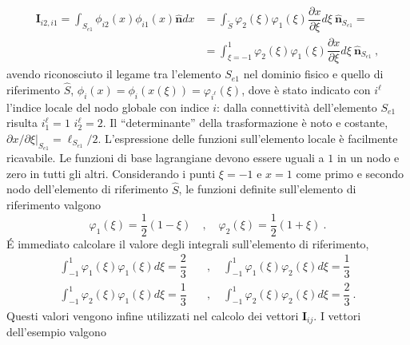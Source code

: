 \begin{equation}
\begin{aligned}
 \bm{I}_{i2,i1} = \int_{S_{e1}} \phi_{i2}(x)\phi_{i1}(x)\bm{\hat{n}} dx & = \int_{\tilde{S}} \varphi_2(\xi) \varphi_1(\xi)  \dfrac{\partial x}{\partial \xi}  d\xi \ \bm{\hat{n}}_{S_{e1}} = \\
 & = \int_{\xi=-1}^{1}\varphi_2(\xi) \varphi_1(\xi)  \dfrac{\partial x}{\partial \xi}  d\xi \ \bm{\hat{n}}_{S_{e1}} \ , 
\end{aligned}
\end{equation}
 avendo riconosciuto il legame tra l'elemento $S_{e1}$ nel dominio fisico e quello di riferimento $\hat{S}$, $\phi_{i}(x) = \phi_i(x(\xi)) = \varphi_{i^{\ell}}(\xi)$, dove è stato indicato con $i^{\ell}$ l'indice locale del nodo globale con indice $i$: dalla connettività dell'elemento $S_{e1}$ risulta $i_1^\ell = 1$ $i_2^\ell = 2$.
Il ``determinante'' della trasformazione è noto e costante, $\partial x/\partial \xi|_{S_{e1}} = \ell_{S_{e1}}/2$. L'espressione delle funzioni sull'elemento locale è facilmente ricavabile. Le funzioni di base lagrangiane devono essere uguali a $1$ in un nodo e zero in tutti gli altri. Considerando i punti $\xi=-1$ e $x=1$ come primo e secondo nodo dell'elemento di riferimento $\hat{S}$, le funzioni definite sull'elemento di riferimento valgono
\begin{equation}
 \varphi_1(\xi) = \dfrac{1}{2}(1-\xi) \quad , \quad
 \varphi_2(\xi) = \dfrac{1}{2}(1+\xi) \ . 
\end{equation}
\'E immediato calcolare il valore degli integrali sull'elemento di riferimento,
\begin{equation}
\begin{aligned}
  \int_{-1}^{1} \varphi_1(\xi) \varphi_1(\xi) d\xi = \dfrac{2}{3} \quad & , \quad   
  \int_{-1}^{1} \varphi_1(\xi) \varphi_2(\xi) d\xi = \dfrac{1}{3} \\ 
  \int_{-1}^{1} \varphi_2(\xi) \varphi_1(\xi) d\xi = \dfrac{1}{3} \quad & , \quad   
  \int_{-1}^{1} \varphi_2(\xi) \varphi_2(\xi) d\xi = \dfrac{2}{3} \ .  
\end{aligned}
\end{equation}
Questi valori vengono infine utilizzati nel calcolo dei vettori $\bm{I}_{ij}$. I vettori dell'esempio valgono
